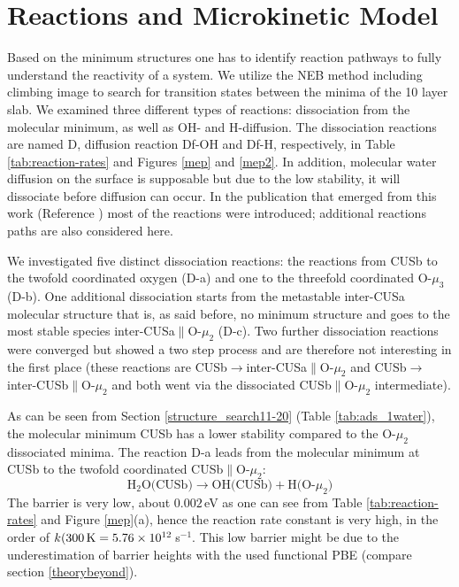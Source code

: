 \documentclass[11pt,DIV=13,BCOR=5mm,a4paper,headinclude]{scrbook}
\begin{document}
\section{Reactions and Microkinetic Model}\label{reactions}

Based on the minimum structures one has to identify reaction pathways to fully understand the reactivity of a system.
We utilize the NEB method including climbing image to search for transition states between the minima of the 10 layer slab.
We examined three different types of reactions: dissociation from the molecular minimum, as well as OH- and H-diffusion.
The dissociation reactions are named D, diffusion reaction Df-OH and Df-H, respectively, in Table \ref{tab:reaction-rates} and Figures \ref{mep} and \ref{mep2}.
In addition, molecular water diffusion on the surface is supposable but due to the low stability, it will dissociate before diffusion can occur.
In the publication that emerged from this work (Reference \cite{Heiden11-20_2018}) most of the reactions were introduced; additional reactions paths are also considered here.


We investigated five distinct dissociation reactions: the reactions from CUSb to the twofold coordinated oxygen (D-a) and one to the threefold coordinated O-$\mu_3$ (D-b).
One additional dissociation starts from the metastable inter-CUSa molecular structure that is, as said before, no minimum structure and goes to the most stable species inter-CUSa$\parallel$O-$\mu_2$ (D-c).
Two further dissociation reactions were converged but showed a two step process and are therefore not interesting in the first place (these reactions are CUSb$\rightarrow$inter-CUSa$\parallel$O-$\mu_2$ and CUSb$\rightarrow$inter-CUSb$\parallel$O-$\mu_2$ and both went via the dissociated CUSb$\parallel$O-$\mu_2$ intermediate).


As can be seen from Section \ref{structure_search11-20} (Table \ref{tab:ads_1water}), the molecular minimum CUSb has a lower stability compared to the O-$\mu_2$ dissociated minima.
The reaction D-a leads from the molecular minimum at CUSb to the twofold coordinated CUSb$\parallel$O-$\mu_2$:
 \begin{equation}
 \text{H$_2$O(CUSb)} \rightarrow \text{OH(CUSb)} + \text{H(O-$\mu_2$)} \tag{D-a}
      \label{dissa}
\end{equation}
The barrier is very low, about $0.002\,$eV as one can see from Table \ref{tab:reaction-rates} and Figure \ref{mep}(a), hence the reaction rate constant is very high, in the order of $k(\textrm{300\,K}=5.76\times 10^{12}\,$s$^{-1}$.
This low barrier might be due to the underestimation of barrier heights\cite{Zhao05} with the used functional PBE (compare section \ref{theorybeyond}).
\end{document}
